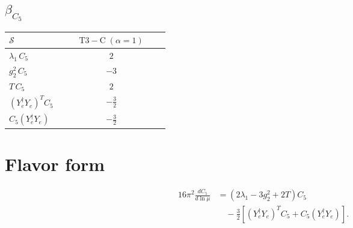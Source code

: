 \documentclass[9pt]{article}
\begin{document}
\subsection*{$ \beta_{C_5} $}
\begin{longtable}{@{}p{0.31\linewidth}c@{}}
\toprule
$\mathcal{S}$ & $ \mathrm{T3-C}\;(\alpha=1) $ \\
\midrule
$ \lambda_1\,C_5 $ & $ 2 $ \\
$ g_2^2\,C_5 $ & $ -3 $ \\
$ T\,C_5 $ & $ 2 $ \\
$ (Y_e^\dagger Y_e)^T C_5 $ & $ - \frac{3}{2} $ \\
$ C_5(Y_e^\dagger Y_e) $ & $ - \frac{3}{2} $ \\
\bottomrule
\end{longtable}
\section*{Flavor form}
\begin{align}
16\pi^2\frac{dC_5}{d\ln\mu}&=(2\lambda_1-3g_2^2+2T)C_5\\
&\quad-\frac32\left[(Y_e^\dagger Y_e)^T C_5+C_5(Y_e^\dagger Y_e)\right].
\end{align}
\end{document}
